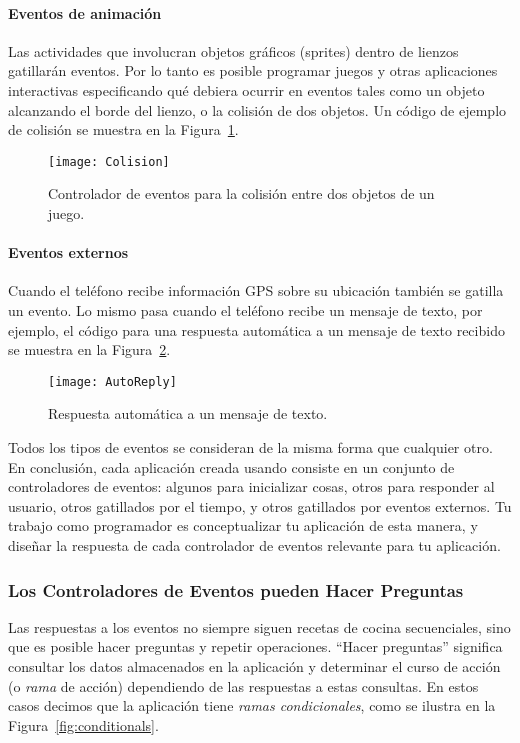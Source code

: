 \paragraph{Eventos de animación}
Las actividades que involucran objetos gráficos (sprites) dentro de lienzos gatillarán eventos. Por lo tanto es posible programar juegos y otras aplicaciones interactivas especificando qué debiera ocurrir en eventos tales como un objeto alcanzando el borde del lienzo, o la colisión de dos objetos. Un código de ejemplo de colisión se muestra en la Figura~\ref{fig:colision}.

\begin{figure}[H]
  \centering
  \texttt{[image: Colision]}
  \caption{Controlador de eventos para la colisión entre dos objetos de un juego.}
  \label{fig:colision}
\end{figure}

\paragraph{Eventos externos}

Cuando el teléfono recibe información GPS sobre su ubicación también se gatilla un evento. Lo mismo pasa cuando el teléfono recibe un mensaje de texto, por ejemplo, el código para una respuesta automática a un mensaje de texto recibido se muestra en la Figura~\ref{fig:autoreply}.

\begin{figure}[H]
  \centering
  \texttt{[image: AutoReply]}
  \caption{Respuesta automática a un mensaje de texto.}
  \label{fig:autoreply}
\end{figure}

Todos los tipos de eventos se consideran de la misma forma que cualquier otro. En conclusión, cada aplicación creada usando \AppInventor consiste en un conjunto de controladores de eventos: algunos para inicializar cosas, otros para responder al usuario, otros gatillados por el tiempo, y otros gatillados por eventos externos. Tu trabajo como programador es conceptualizar tu aplicación de esta manera, y diseñar la respuesta de cada controlador de eventos relevante para tu aplicación.

\subsubsection*{Los Controladores de Eventos pueden Hacer Preguntas}
Las respuestas a los eventos no siempre siguen recetas de cocina secuenciales, sino que es posible hacer preguntas y repetir operaciones. ``Hacer preguntas'' significa consultar los datos almacenados en la aplicación y determinar el curso de acción (o \emph{rama} de acción) dependiendo de las respuestas a estas consultas. En estos casos decimos que la aplicación tiene \emph{ramas condicionales}, como se ilustra en la Figura~\ref{fig:conditionals}.

